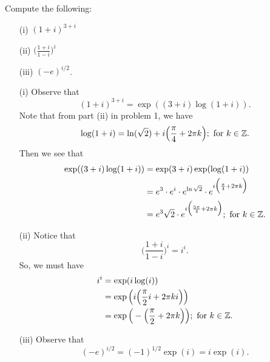 \documentclass[a4paper]{article}
\begin{document}
\begin{problem}
   Compute the following: 
   \begin{enumerate}
       \item[(i)] \( (1 + i)^{3 +i} \)
        \item[(ii)] \( \Big(  \frac{ 1 + i  }{  1 - i  }  \Big)^{i} \)
        \item[(iii)] \( (-e)^{i/2} \).
   \end{enumerate}
\end{problem}
\begin{solution}
    \begin{enumerate}
        \item[(i)] Observe that 
            \[  (1+i)^{3+i} = \exp((3+i)\log(1+i)). \]
            Note that from part (ii) in problem 1, we have  
            \[  \log(1+i) = \ln(\sqrt{ 2 } ) + i \Big(  \frac{ \pi }{ 4 }  + 2 \pi k  \Big); \ \text{for} \ k \in \mathbb{Z}.  \]
            Then we see that
            \begin{align*}
                \exp((3+i)\log(1+i)) &= \exp(3+i) \exp(\log(1+i)) \\
                                     &= e^{3} \cdot e^{i} \cdot e^{\ln \sqrt{ 2 } } \cdot e^{i \Big(  \frac{ \pi  }{ 4 }  + 2 \pi k \Big)} \\
                                     &= e^{3} \sqrt{ 2 } \cdot e^{i \Big(  \frac{ 5 \pi  }{ 4  }  + 2 \pi k  \Big)}; \ \text{for} \ k \in \mathbb{Z}.  
            \end{align*}
        \item[(ii)] Notice that  
            \[  \Big(  \frac{ 1 + i  }{  1 - i  }   \Big)^{i} = i^{i}.  \]
            So, we must have
            \begin{align*}
                i^{i} &= \exp(i \log(i)) \\
                      &= \exp \Big(  i \Big(  \frac{ \pi }{ 2 }  i + 2 \pi k i  \Big) \Big)\\
                      &= \exp \Big(  - \Big(  \frac{ \pi }{ 2 }  + 2 \pi k  \Big) \Big) ; \ \text{for} \ k \in \mathbb{Z}.  
            \end{align*}
        \item[(iii)] Observe that 
            \[  (-e)^{i/2} = (-1)^{1/2} \exp(i) = i \exp(i).  \]
    \end{enumerate}
\end{solution}
\end{document}
